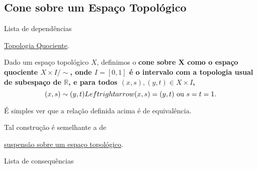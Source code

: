 \subsection{Cone sobre um Espaço Topológico}
\label{cone-def}
\begin{titlemize}{Lista de dependências}
	\item \hyperref[topologia-quociente-def]{Topologia Quociente}.
\end{titlemize}
\begin{def}[Cone]
	Dado um espaço topológico $X$, definimos o \bf{cone sobre X} como o espaço quociente $X\times I/\sim$, onde $I=[0,1]$ é o intervalo com a topologia usual de subespaço de $\mathbb{R}$, e para todos $(x,s),(y,t) \in X\times I$,\[
    (x,s)\sim(y,t) \\Leftrightarrow (x,s)=(y,t)\text{ ou }s=t=1.
    \]
\end{def}

É simples ver que a relação definida acima é de equivalência.

Tal construção é semelhante a de \item \hyperref[suspensao-def]{suspensão sobre um espaço topológico}.

\begin{titlemize}{Lista de consequências}
\end{titlemize}